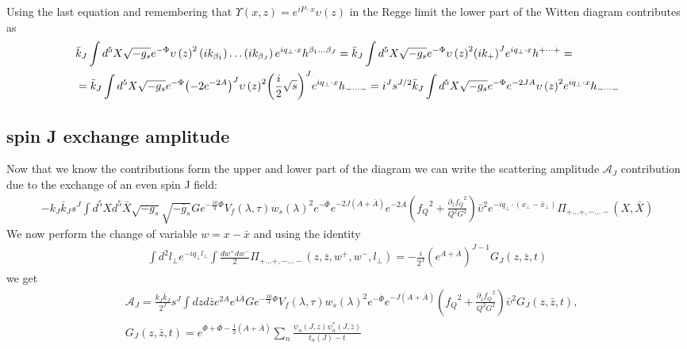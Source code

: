 \documentclass[10 pt]{article}
\begin{document}
Using the last equation and remembering that $\Upsilon\left(x, z\right) = e^{i P \cdot x} \upsilon\left(z\right)$ in the Regge limit the lower part of the Witten diagram contributes as
\begin{align}
&\bar{k}_J \int d^5 X \sqrt{-g_s} e^{-\Phi}  {\upsilon\left(z\right)}^2 \left( i k_{\beta_1}\right) \dots \left( i k_{\beta_J}\right) e^{i q_\perp \cdot x}  h^{\beta_1 \dots \beta_J} = \bar{k}_J \int d^5 X \sqrt{-g_s} e^{-\Phi}  {\upsilon\left(z\right)}^2 {\left( i k_+\right)}^J e^{i q_\perp \cdot x}  h^{+ \dots +} = \notag \\
& = \bar{k}_J \int d^5 X \sqrt{-g_s} e^{-\Phi} {\left( - 2 e^{-2 A}\right)}^J {\upsilon\left(z\right)}^2 {\left( \frac{i}{2} \sqrt{s}\right)}^J e^{i q_\perp \cdot x}  h_{- \dots -}  = i^J s^{J/2}  \bar{k}_J \int d^5 X \sqrt{-g_s} e^{-\Phi} e^{-2 J A} {\upsilon\left(z\right)}^2 e^{i q_\perp \cdot x}  h_{- \dots -}
\end{align}

\subsection{spin J exchange amplitude}
Now that we know the contributions form the upper and lower part of the diagram we can write the scattering amplitude $\mathcal{A}_J$ contribution due to the exchange of an even spin J field:
\begin{align}
 - k_J \bar{k}_J s^J \int d^5X d^5 \bar{X} \sqrt{-g_s} \sqrt{-\bar{g}_s} G e^{-\frac{10}{3}\Phi} V_f \left( \lambda, \tau \right) {w_s\left(\lambda \right)}^2 e^{-\bar{\Phi}} e^{-2 J \left(A+\bar{A}\right)}  e^{-2A} \left(  {f_Q}^2 + \frac{{\partial_z f_Q}^2}{Q^2 G^2}  \right)  {\bar{\upsilon}}^2 e^{-i q_\perp \cdot \left( x_\perp - \bar{x}_\perp \right)} \Pi _{+\dots+,-\dots-}\left(X, \bar{X} \right)
\end{align}
We now perform the change of variable $w = x - \bar{x}$ and using the identity
\begin{align}
 \int d^2 l_\perp e^{- i q_\perp l_\perp} \int \frac{dw^+ dw^-}{2} \Pi_{+ \dots +, - \dots -} \left(z, \bar{z}, w^+, w^-, l_\perp \right) = - \frac{i}{2^J} {\left( e^{A + \bar{A}} \right)}^{J-1}G_J \left(z, \bar{z}, t\right)
\end{align}
we get
\begin{align}
 & \mathcal{A}_J = \frac{k_J \bar{k}_J}{2^J} s^J \int dz d\bar{z} e^{2 A}e^{4 \bar{A}} G e^{-\frac{10}{3}\Phi} V_f \left( \lambda, \tau \right) {w_s\left(\lambda \right)}^2 e^{-\bar{\Phi}} e^{-J \left(A+\bar{A}\right)}  \left(  {f_Q}^2 + \frac{{\partial_z f_Q}^2}{Q^2 G^2}  \right)  {\bar{\upsilon}}^2 G_J \left(z, \bar{z}, t\right), \\ 
 & G_J \left(z , \bar{z}, t \right) = e^{\Phi + \bar{\Phi} - \frac{1}{2} \left(A + \bar{A}\right)} \sum_n \frac{\psi_n \left(J, z\right) \psi_n^* \left(J, \bar{z}\right)}{t_n\left(J\right) - t}
\end{align}
\end{document}

